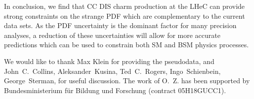 \documentclass[pdftex,twocolumn,epjc3]{svjour3}          %
\begin{document}
%
In conclusion, we find that CC DIS charm production at the LHeC can
provide strong constraints on the strange PDF which are complementary
to the current data sets.
%
As the PDF uncertainty is the dominant factor for many precision
analyses, a reduction of these uncertainties will allow for more
accurate predictions which can be used to constrain both SM and BSM
physics processes.




\begin{acknowledgements}

We would like to thank
Max Klein for providing the pseudodata, and 
John~C.~Collins,
Aleksander~Kusina,
Ted~C.~Rogers,
Ingo~Schienbein,
George~Sterman,
for useful discussion.
The work of O.~Z. has been supported by Bundesministerium f\"ur Bildung und Forschung (contract 05H18GUCC1).

\end{acknowledgements}





\end{document}
